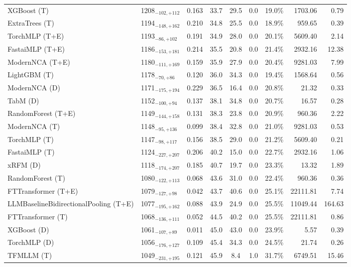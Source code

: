 \begin{tabular}{llcccccrr}
XGBoost (T) & 1208${}_{-102,+112}$ & 0.163 & 33.7 & 29.5 & 0.0 & 19.0\% & 1703.06 & 0.79 \\
ExtraTrees (T) & 1194${}_{-148,+162}$ & 0.210 & 34.8 & 25.5 & 0.0 & 18.9\% & 959.65 & 0.39 \\
TorchMLP (T+E) & 1193${}_{-86,+102}$ & 0.191 & 34.9 & 28.0 & 0.0 & 20.1\% & 5609.40 & 2.14 \\
FastaiMLP (T+E) & 1186${}_{-153,+181}$ & 0.214 & 35.5 & 20.8 & 0.0 & 21.4\% & 2932.16 & 12.38 \\
ModernNCA (T+E) & 1180${}_{-111,+169}$ & 0.159 & 35.9 & 27.9 & 0.0 & 20.4\% & 9281.03 & 7.99 \\
LightGBM (T) & 1178${}_{-70,+86}$ & 0.120 & 36.0 & 34.3 & 0.0 & 19.4\% & 1568.64 & 0.56 \\
ModernNCA (D) & 1171${}_{-175,+194}$ & 0.229 & 36.5 & 16.4 & 0.0 & 20.8\% & 21.32 & 0.33 \\
TabM (D) & 1152${}_{-100,+94}$ & 0.137 & 38.1 & 34.8 & 0.0 & 20.7\% & 16.57 & 0.28 \\
RandomForest (T+E) & 1149${}_{-144,+158}$ & 0.131 & 38.3 & 23.8 & 0.0 & 20.9\% & 960.36 & 2.22 \\
ModernNCA (T) & 1148${}_{-95,+136}$ & 0.099 & 38.4 & 32.8 & 0.0 & 21.0\% & 9281.03 & 0.53 \\
TorchMLP (T) & 1147${}_{-98,+117}$ & 0.156 & 38.5 & 29.0 & 0.0 & 21.2\% & 5609.40 & 0.21 \\
FastaiMLP (T) & 1124${}_{-227,+207}$ & 0.206 & 40.2 & 15.0 & 0.0 & 22.7\% & 2932.16 & 1.06 \\
xRFM (D) & 1118${}_{-174,+207}$ & 0.185 & 40.7 & 19.7 & 0.0 & 23.3\% & 13.32 & 1.89 \\
RandomForest (T) & 1080${}_{-122,+113}$ & 0.068 & 43.6 & 31.0 & 0.0 & 22.4\% & 960.36 & 0.36 \\
FTTransformer (T+E) & 1079${}_{-127,+98}$ & 0.042 & 43.7 & 40.6 & 0.0 & 25.1\% & 22111.81 & 7.74 \\
LLMBaselineBidirectionalPooling (T+E) & 1077${}_{-195,+162}$ & 0.088 & 43.9 & 24.9 & 0.0 & 25.5\% & 11049.44 & 164.63 \\
FTTransformer (T) & 1068${}_{-136,+111}$ & 0.052 & 44.5 & 40.2 & 0.0 & 25.5\% & 22111.81 & 0.86 \\
XGBoost (D) & 1061${}_{-107,+89}$ & 0.011 & 45.0 & 43.0 & 0.0 & 23.9\% & 5.57 & 0.39 \\
TorchMLP (D) & 1056${}_{-176,+127}$ & 0.109 & 45.4 & 34.3 & 0.0 & 24.5\% & 21.74 & 0.26 \\
TFMLLM (T) & 1049${}_{-231,+195}$ & 0.121 & 45.9 & 8.4 & 1.0 & 31.7\% & 6749.51 & 15.46 \\

\end{tabular}
